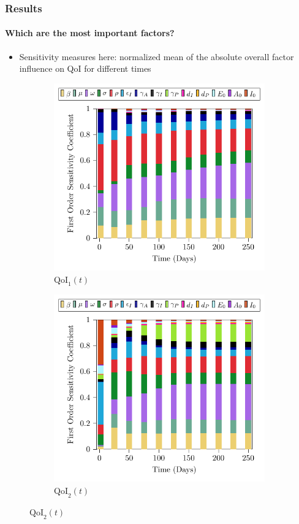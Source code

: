 \documentclass{beamer}
\begin{document}
\begin{frame}
\frametitle{Results} 
\framesubtitle{Which are the most important factors?} 
\begin{itemize}
    \item Sensitivity measures here: normalized mean of the absolute overall factor influence on QoI for different times
\end{itemize}
	
	\begin{figure}
		\centering
		\begin{subfigure}[t]{0.49\textwidth}
			\centering
			\includegraphics[width=\textwidth]{figs/EE_Brasil_Rt.pdf}
			\caption*{$\text{QoI}_1(t)$}
		\end{subfigure}
		\hfill
		\begin{subfigure}[t]{0.49\textwidth}
			\centering
			\includegraphics[width=\textwidth]{figs/EE_Brasil_CtDt.pdf}
			\caption*{$\text{QoI}_2(t)$}
		\end{subfigure}
	\end{figure}
\end{frame}
\end{document}
